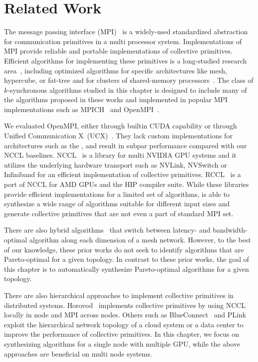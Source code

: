 
\section{Related Work}
The message passing interface (MPI)~\cite{dongarra2013mpi} is a
widely-used standardized abstraction for communication primitives in a
multi processor system. Implementations of MPI provide reliable and
portable implementations of collective primitives. Efficient
algorithms for implementing these primitives is a long-studied
research area~\cite{pjevsivac2007performance, chan2007collective,
thakur2005optimization}, including optimized algorithms for specific
architectures like mesh, hypercube, or
fat-tree\cite{scott1991efficient,bokhari1992complete,barnett1993global}
and for clusters of shared-memory
processors~\cite{sistare1999optimization,traff2002improved,sanders2002hierarchical,tipparaju2003fast}.
The class of $k$-synchronous algorithms studied in this chapter is
designed to include many of the algorithms proposed in these works and
implemented in popular MPI implementations such as
MPICH~\cite{thakur2005optimization} and
OpenMPI~\cite{gabriel2004open}.

We evaluated OpenMPI, either through builtin CUDA capability or
through Unified Communication X~(UCX)~\cite{ucx}. They lack custom
implementations for architectures such as the \dgxone{}, and result in
subpar performance compared with our NCCL baselines. NCCL~\cite{nccl}
is a library for multi NVIDIA GPU systems and it utilizes the
underlying hardware transport such as NVLink, NVSwitch or Infiniband
for an efficient implementation of collective primitives.
RCCL~\cite{rccl} is a port of NCCL for AMD GPUs and the HIP compiler
suite. While these libraries provide efficient implementations for a
limited set of algorithms, \tool{} is able to synthesize a wide range
of algorithms suitable for different input sizes and generate
collective primitives that are not even a part of standard MPI set.

There are also hybrid algorithms~\cite{barnett1994building,
chan2007collective} that switch between latency- and bandwidth-optimal
algorithm along each dimension of a mesh network. However, to the best
of our knowledge, these prior works do not seek to identify algorithms
that are Pareto-optimal for a given topology. In contrast to these
prior works, the goal of this chapter is to automatically synthesize
Pareto-optimal algorithms for a given topology.

There are also hierarchical approaches to implement collective
primitives in distributed systems. Horovod~\cite{alex2018horovod}
implements collective primitives by using NCCL locally in node and MPI
across nodes. Others such as BlueConnect~\cite{blueconnect} and
PLink~\cite{plink} exploit the hierarchical network topology of a
cloud system or a data center to improve the performance of collective
primitives. In this chapter, we focus on synthesizing algorithms for a
single node with multiple GPU, while the above approaches are
beneficial on multi node systems.

